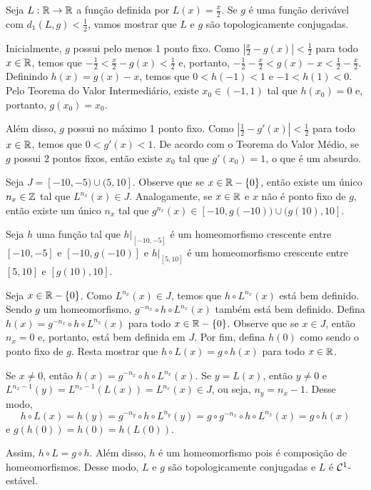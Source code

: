 \begin{example}
Seja $L: \mathbb{R} \to \mathbb{R}$ a função definida por $L(x) = \frac{x}{2}$. Se $g$ é uma função derivável com $d_1(L, g) < \frac{1}{2}$, vamos mostrar que $L$ e $g$ são topologicamente conjugadas.

Inicialmente, $g$ possui pelo menos 1 ponto fixo. Como $\left| \frac{x}{2} - g(x) \right| < \frac{1}{2}$ para todo $x \in \mathbb{R}$, temos que $-\frac{1}{2} < \frac{x}{2} - g(x) < \frac{1}{2}$ e, portanto, $-\frac{1}{2} - \frac{x}{2} < g(x) - x < \frac{1}{2} - \frac{x}{2}$. Definindo $h(x) = g(x) - x$, temos que $0 < h(-1) < 1$ e $-1 < h(1) < 0$. Pelo Teorema do Valor Intermediário, existe $x_0 \in (-1, 1)$ tal que $h(x_0) = 0$ e, portanto, $g(x_0) = x_0$.

Além disso, $g$ possui no máximo 1 ponto fixo. Como $\left| \frac{1}{2} - g'(x) \right| < \frac{1}{2}$ para todo $x \in \mathbb{R}$, temos que $0 < g'(x) < 1$. De acordo com o Teorema do Valor Médio, se $g$ possui $2$ pontos fixos, então existe $x_0$ tal que $g'(x_0) = 1$, o que é um absurdo.

Seja $J = [-10, -5) \cup (5, 10]$. Observe que se $x \in \mathbb{R} - \{0\}$, então existe um único $n_x \in \mathbb{Z}$ tal que $L^{n_x}(x) \in J$. Analogamente, se $x \in \mathbb{R}$ e $x$ não é ponto fixo de $g$, então existe um único $n_x$ tal que $g^{n_x}(x) \in [-10, g(-10)) \cup (g(10), 10]$.

Seja $h$ uma função tal que $h|_{[-10, -5]}$ é um homeomorfismo crescente entre $[-10, -5]$ e $[-10, g(-10)]$ e $h|_{[5, 10]}$ é um homeomorfismo crescente entre $[5, 10]$ e $[g(10), 10]$.

Seja $x \in \mathbb{R} - \{0\}$. Como $L^{n_x}(x) \in J$, temos que $h \circ L^{n_x}(x)$ está bem definido. Sendo $g$ um homeomorfismo, $g^{-n_x} \circ h \circ L^{n_x}(x)$ também está bem definido. Defina $h(x) = g^{-n_x} \circ h \circ L^{n_x}(x)$ para todo $x \in \mathbb{R} - \{0\}$. Observe que se $x \in J$, então $n_x = 0$ e, portanto, está bem definida em $J$. Por fim, defina $h(0)$ como sendo o ponto fixo de $g$. Resta mostrar que $h \circ L(x) = g \circ h(x)$ para todo $x \in \mathbb{R}$.

Se $x \neq 0$, então $h(x) = g^{-n_x} \circ h \circ L^{n_x}(x)$. Se $y = L(x)$, então $y \neq 0$ e $L^{n_x - 1}(y) = L^{n_x - 1}(L(x)) = L^{n_x}(x) \in J$, ou seja, $n_y = n_x - 1$. Desse modo,
$$h \circ L(x) = h(y) = g^{-n_y} \circ h \circ L^{n_y}(y) = g \circ g^{-n_x} \circ h \circ L^{n_x}(x) = g \circ h(x)$$
e $g(h(0)) = h(0) = h(L(0))$.

Assim, $h \circ L = g \circ h$. Além disso, $h$ é um homeomorfismo pois é composição de homeomorfismos. Desse modo, $L$ e $g$ são topologicamente conjugadas e $L$ é $\mathcal{C}^1$-estável.
\end{example}

